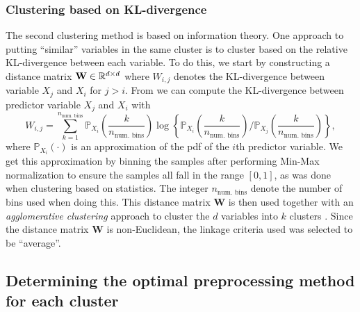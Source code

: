 \documentclass{statsmsc}
\begin{document}
{\subsubsection{Clustering based on KL-divergence}%
\label{sub:Clustering based on KL-divergence}

The second clustering method is based on information theory.
One approach to putting ``similar'' variables in the same cluster is to cluster based on the
relative \ac{KL-divergence} between each variable.
To do this, we start by constructing a
distance matrix $\mathbf{W} \in \mathbb{R}^{d \times d}$ where $W_{i,j}$ denotes the
\ac{KL-divergence} between variable $X_j$ and $X_i$ for $j > i$. From
\citep{mackay} we can compute the \ac{KL-divergence} between predictor variable $X_j$ and $X_i$
with
\begin{equation}
    W_{i,j}= \sum^{n_{\textrm{num. bins} }}_{k=1} \mathbb{P}_{X_i}\left( \frac{k}{n_{\textrm{num. bins} }}  \right)
    \log\left\{
    \mathbb{P}_{X_i}\left( \frac{k}{n_{\textrm{num. bins} }}  \right) \bigg/
    \mathbb{P}_{X_j}\left( \frac{k}{n_{\textrm{num. bins} }}  \right)
\right\},
\end{equation}
where $\mathbb{P}_{X_i}(\cdot)$ is an approximation of the \ac{pdf} of the $i$th predictor variable.
We get this approximation by binning the samples after performing Min-Max normalization to ensure
the samples all fall in the range $[0,1]$, as was done when clustering based on statistics.
The integer $n_{\textrm{num. bins}}$ denote the number of bins used when doing this.
This distance matrix $\mathbf{W}$ is then used together with an \textit{agglomerative clustering}
approach to cluster the $d$ variables into $k$ clusters
\citep{hierarchical_clustering}. Since the distance matrix $\mathbf{W}$ is
non-Euclidean, the linkage criteria used was selected to be ``average''.


\subsection{Determining the optimal preprocessing method for each cluster}%
\label{sub:Determining the optimal preprocessing method for each clusterch cluster}

}
\end{document}
